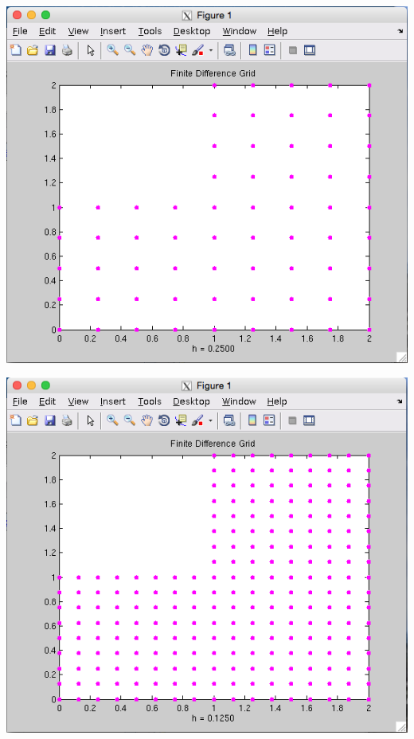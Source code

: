 \documentclass[11pt, oneside]{article}   	%
\begin{document}
\centerline{\includegraphics[scale = 0.55]{Grid_h2.png}}

\centerline{\includegraphics[scale = 0.55]{Grid_h3.png}}
\end{document}

